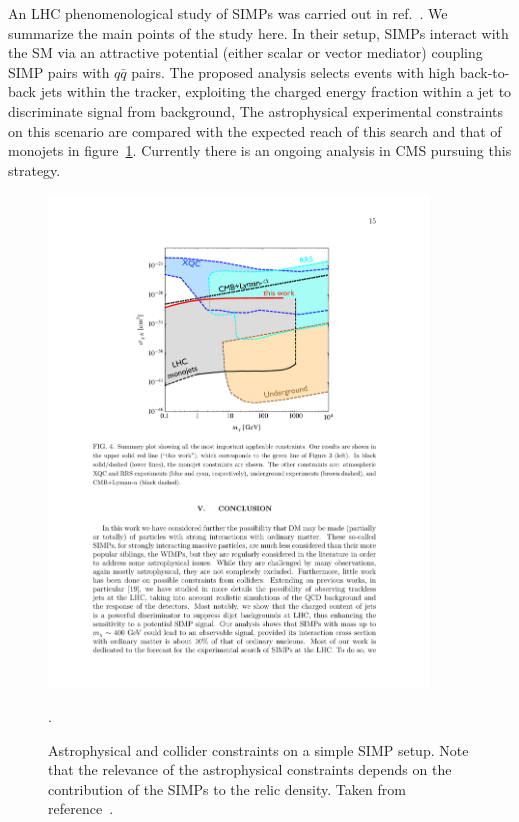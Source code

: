 An LHC phenomenological study of SIMPs was carried out in ref.~\cite{Daci:2015hca}. We summarize the main points of the study here. In their setup, SIMPs interact with the SM via an attractive potential (either scalar or vector mediator) coupling SIMP pairs with $q\bar{q}$ pairs. The proposed analysis selects events with high \pT back-to-back jets within the tracker, exploiting the charged energy fraction within a jet to discriminate signal from background,  The astrophysical experimental constraints on this scenario are compared with the expected reach of this search and that of monojets in figure~\ref{fig:simps}. Currently there is an ongoing analysis in CMS pursuing this strategy.

\begin{figure}[htb]
\centering
\includegraphics[width=0.9\textwidth]{plots/simps_constraints.pdf}
\caption{Astrophysical and collider constraints on a simple SIMP setup. Note that the relevance of the astrophysical constraints depends on the contribution of the SIMPs to the relic density. Taken from reference~\cite{Daci:2015hca}.}
  \label{fig:simps}.
\end{figure}

